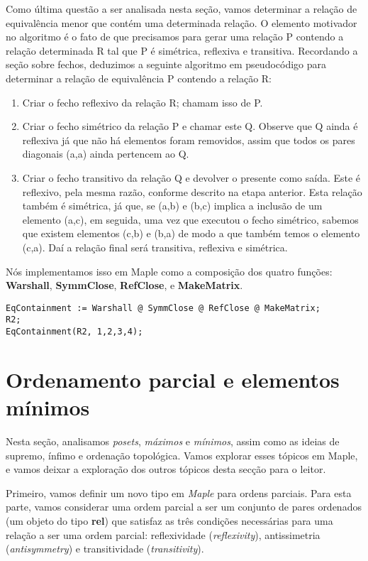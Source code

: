 \documentclass[a4paper]{article}
\begin{document}
Como última questão a ser analisada nesta seção, vamos determinar a relação de equivalência menor que contém uma determinada relação. O elemento motivador no algoritmo é o fato de que precisamos para gerar uma relação P contendo a relação determinada R tal que P é simétrica, reflexiva e transitiva. Recordando a seção sobre fechos, deduzimos a seguinte algoritmo em pseudocódigo para determinar a relação de equivalência P contendo a relação R:

\begin{enumerate}
\item{Criar o fecho reflexivo da relação R; chamam isso de P.}
\item{Criar o fecho simétrico da relação P e chamar este Q. Observe que Q ainda é reflexiva já que não há elementos foram removidos, assim que todos os pares diagonais (a,a) ainda pertencem ao Q.}
\item{Criar o fecho transitivo da relação Q e devolver o presente como saída. Este é reflexivo, pela mesma razão, conforme descrito na etapa anterior. Esta relação também é simétrica, já que, se (a,b) e (b,c) implica a inclusão de um elemento (a,c), em seguida, uma vez que executou o fecho simétrico, sabemos que existem elementos (c,b) e (b,a) de modo a que também temos o elemento (c,a). Daí a relação final será transitiva, reflexiva e simétrica.}
\end{enumerate}

Nós implementamos isso em Maple como a composição dos quatro funções: \textbf{Warshall}, \textbf{SymmClose}, \textbf{RefClose}, e \textbf{MakeMatrix}.

\begin{lstlisting}
EqContainment := Warshall @ SymmClose @ RefClose @ MakeMatrix;
R2;
EqContainment(R2, 1,2,3,4);
\end{lstlisting}

\section{Ordenamento parcial e elementos mínimos}
Nesta seção, analisamos \textit{posets}, \textit{máximos} e \textit{mínimos}, assim como as ideias de supremo, ínfimo e ordenação topológica. Vamos explorar esses tópicos em Maple, e vamos deixar a exploração dos outros tópicos desta secção para o leitor.

Primeiro, vamos definir um novo tipo em \textit{Maple} para ordens parciais. Para esta parte, vamos considerar uma ordem parcial a ser um conjunto de pares ordenados (um objeto do tipo \textbf{rel}) que satisfaz as três condições necessárias para uma relação a ser uma ordem parcial: reflexividade (\textit{reflexivity}), antissimetria (\textit{antisymmetry}) e transitividade (\textit{transitivity}).
\end{document}
